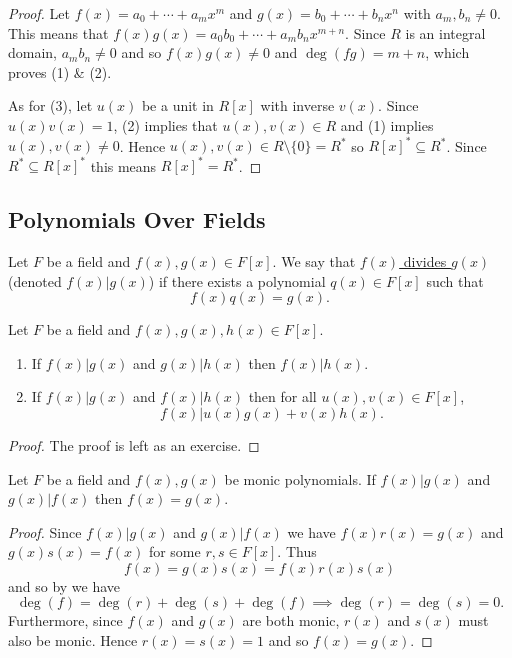 \documentclass[11pt]{article}
\begin{document}
\begin{proof}
    Let $f(x)=a_0+\cdots+a_mx^m$ and $g(x)=b_0+\cdots+b_nx^n$ with $a_m,b_n\neq0$. This means that $f(x)g(x)=a_0b_0+\cdots+a_mb_nx^{m+n}$. Since $R$ is an integral domain, $a_mb_n\neq0$ and so $f(x)g(x)\neq0$ and $\deg(fg)=m+n$, which proves (1) \& (2).

    As for (3), let $u(x)$ be a unit in $R[x]$ with inverse $v(x)$. Since $u(x)v(x)=1$, (2) implies that $u(x),v(x)\in R$ and (1) implies $u(x),v(x)\neq0$. Hence $u(x),v(x)\in R\setminus\{0\}=R^*$ so $R[x]^*\subseteq R^*$. Since $R^*
    \subseteq R[x]^*$ this means $R[x]^*=R^*$.
\end{proof}

\subsection{Polynomials Over Fields}

\begin{definition}
    Let $F$ be a field and $f(x),g(x)\in F[x]$. We say that \ul{$f(x)$ divides $g(x)$} (denoted $f(x)|g(x)$) if there exists a polynomial $q(x)\in F[x]$ such that $$f(x)q(x)=g(x).$$
\end{definition}

\begin{proposition}
    Let $F$ be a field and $f(x),g(x),h(x)\in F[x]$.
    \begin{enumerate}
        \item If $f(x)|g(x)$ and $g(x)|h(x)$ then $f(x)|h(x)$.
        \item If $f(x)|g(x)$ and $f(x)|h(x)$ then for all $u(x),v(x)\in F[x]$,
        \[f(x)|u(x)g(x)+v(x)h(x).\]
    \end{enumerate}
\end{proposition}

\begin{proof}
    The proof is left as an exercise.
\end{proof}

\begin{proposition}
    Let $F$ be a field and $f(x),g(x)$ be monic polynomials. If $f(x)|g(x)$ and $g(x)|f(x)$ then $f(x)=g(x)$.
\end{proposition}

\begin{proof}
    Since $f(x)|g(x)$ and $g(x)|f(x)$ we have $f(x)r(x)=g(x)$ and $g(x)s(x)=f(x)$ for some $r,s\in F[x]$. Thus
    \[f(x)=g(x)s(x)=f(x)r(x)s(x)\]
    and so by  we have
    \[\deg(f)=\deg(r)+\deg(s)+\deg(f)\implies\deg(r)=\deg(s)=0.\]
    Furthermore, since $f(x)$ and $g(x)$ are both monic, $r(x)$ and $s(x)$ must also be monic. Hence $r(x)=s(x)=1$ and so $f(x)=g(x)$.
\end{proof}
\end{document}
